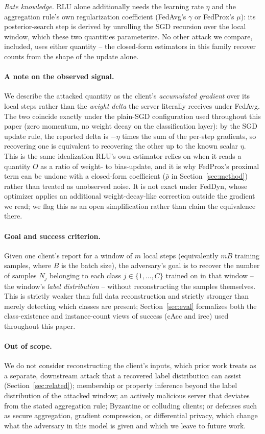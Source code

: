 \emph{Rate knowledge.} RLU alone additionally needs the learning rate
$\eta$ and the aggregation rule's own regularization coefficient (FedAvg's
$\gamma$ or FedProx's $\mu$): its posterior-search step is derived by
unrolling the SGD recursion over the local window, which these two
quantities parameterize. No other attack we compare, \ourmethod{}
included, uses either quantity -- the closed-form estimators in this
family recover counts from the shape of the update alone.

\paragraph{A note on the observed signal.}
We describe the attacked quantity as the client's \emph{accumulated
gradient} over its local steps rather than the \emph{weight delta} the
server literally receives under FedAvg. The two coincide exactly under the
plain-SGD configuration used throughout this paper (zero momentum, no
weight decay on the classification layer): by the SGD update rule, the
reported delta is $-\eta$ times the sum of the per-step gradients, so
recovering one is equivalent to recovering the other up to the known
scalar $\eta$. This is the same idealization RLU's own estimator relies on
when it reads a quantity $O$ as a ratio of weight- to bias-update, and it
is why FedProx's proximal term can be undone with a closed-form
coefficient ($\bar\rho$ in Section~\ref{sec:method}) rather than treated as
unobserved noise. It is not exact under FedDyn, whose optimizer applies an
additional weight-decay-like correction outside the gradient we read; we
flag this as an open simplification rather than claim the equivalence
there.

\paragraph{Goal and success criterion.}
Given one client's report for a window of $m$ local steps (equivalently
$mB$ training samples, where $B$ is the batch size), the adversary's goal
is to recover the number of samples $N_j$ belonging to each class
$j \in \{1,\dots,C\}$ trained on in that window -- the window's \emph{label
distribution} -- without reconstructing the samples themselves. This is
strictly weaker than full data reconstruction and strictly stronger than
merely detecting which classes are present; Section~\ref{sec:eval}
formalizes both the class-existence and instance-count views of success
(cAcc and irec) used throughout this paper.

\paragraph{Out of scope.}
We do not consider reconstructing the client's inputs, which prior work
treats as a separate, downstream attack that a recovered label
distribution can assist (Section~\ref{sec:related}); membership or
property inference beyond the label distribution of the attacked window;
an actively malicious server that deviates from the stated aggregation
rule; Byzantine or colluding clients; or defenses such as secure
aggregation, gradient compression, or differential privacy, which change
what the adversary in this model is given and which we leave to future
work.
